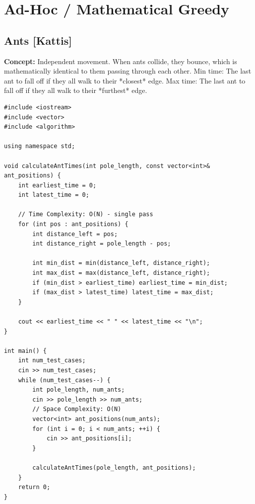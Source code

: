\section{Ad-Hoc / Mathematical Greedy}

\subsection{Ants [Kattis]}
\textbf{Concept:} Independent movement. When ants collide, they bounce, which is mathematically identical to them passing through each other.
Min time: The last ant to fall off if they all walk to their *closest* edge.
Max time: The last ant to fall off if they all walk to their *furthest* edge.
\begin{lstlisting}
#include <iostream>
#include <vector>
#include <algorithm>

using namespace std;

void calculateAntTimes(int pole_length, const vector<int>& ant_positions) {
    int earliest_time = 0;
    int latest_time = 0;
    
    // Time Complexity: O(N) - single pass
    for (int pos : ant_positions) {
        int distance_left = pos;
        int distance_right = pole_length - pos;
        
        int min_dist = min(distance_left, distance_right);
        int max_dist = max(distance_left, distance_right);
        if (min_dist > earliest_time) earliest_time = min_dist;
        if (max_dist > latest_time) latest_time = max_dist;
    }
    
    cout << earliest_time << " " << latest_time << "\n";
}

int main() {
    int num_test_cases;
    cin >> num_test_cases;
    while (num_test_cases--) {
        int pole_length, num_ants;
        cin >> pole_length >> num_ants;
        // Space Complexity: O(N)
        vector<int> ant_positions(num_ants);
        for (int i = 0; i < num_ants; ++i) {
            cin >> ant_positions[i];
        }
        
        calculateAntTimes(pole_length, ant_positions);
    }
    return 0;
}
\end{lstlisting}
